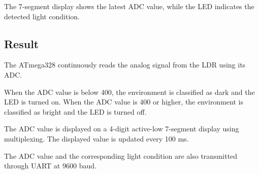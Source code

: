 \documentclass[12pt,a4paper]{article}
\begin{document}
The 7-segment display shows the latest ADC value, while the LED
indicates the detected light condition.

\subsection{Result}

The ATmega328 continuously reads the analog signal from the LDR using
its ADC.

When the ADC value is below 400, the environment is classified as
dark and the LED is turned on. When the ADC value is 400 or higher,
the environment is classified as bright and the LED is turned off.

The ADC value is displayed on a 4-digit active-low 7-segment display
using multiplexing. The displayed value is updated every 100 ms.

The ADC value and the corresponding light condition are also
transmitted through UART at 9600 baud.
\end{document}
